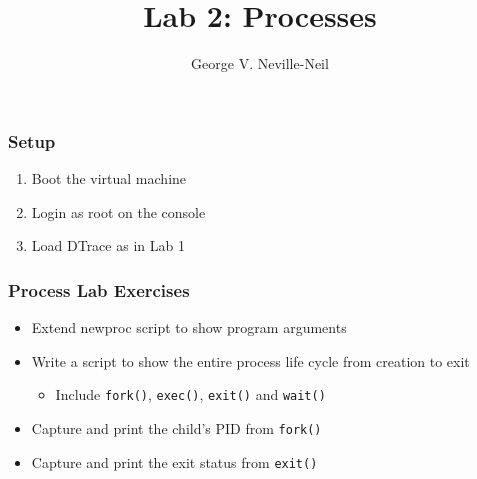 \documentclass[pdftex]{beamer}
\begin{document}

\title{Lab 2: Processes}
\author[shortname]{George V. Neville-Neil}

\begin{frame}
  \frametitle{Setup}
  \begin{enumerate}
  \item Boot the virtual machine
  \item Login as root on the console
  \item Load DTrace as in Lab 1
  \end{enumerate}
\end{frame}

\begin{frame}[fragile]
  \frametitle{Process Lab Exercises}
  \begin{itemize}
  \item Extend newproc script to show program arguments
  \item Write a script to show the entire process life cycle from creation
    to exit
    \begin{itemize}
    \item Include \texttt{fork()}, \texttt{exec()}, \texttt{exit()} and
      \texttt{wait()}
    \end{itemize}
  \item Capture and print the child's PID from \texttt{fork()}
  \item Capture and print the exit status from \texttt{exit()}
  \end{itemize}
\end{frame}
\end{document}
